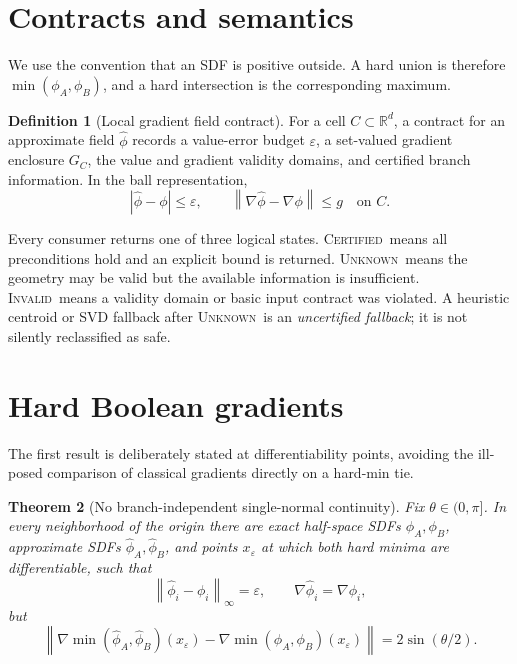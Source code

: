 \documentclass[11pt]{article}
\newtheorem{theorem}{Theorem}
\theoremstyle{definition}
\newtheorem{definition}[theorem]{Definition}
\newcommand{\R}{\mathbb{R}}
\newcommand{\norm}[1]{\left\lVert#1\right\rVert}
\newcommand{\Certified}{\textsc{Certified}}
\newcommand{\Unknown}{\textsc{Unknown}}
\newcommand{\Invalid}{\textsc{Invalid}}
\begin{document}
\section{Contracts and semantics}

We use the convention that an SDF is positive outside.  A hard union is
therefore \(\min(\phi_A,\phi_B)\), and a hard intersection is the corresponding
maximum.

\begin{definition}[Local gradient field contract]
For a cell \(C\subset\R^d\), a contract for an approximate field
\(\widehat\phi\) records a value-error budget \(\varepsilon\), a set-valued
gradient enclosure \(G_C\), the value and gradient validity domains, and
certified branch information.  In the ball representation,
\[
|\widehat\phi-\phi|\le\varepsilon,
\qquad
\norm{\nabla\widehat\phi-\nabla\phi}\le g
\quad\text{on }C.
\]
\end{definition}

Every consumer returns one of three logical states.  \Certified\ means all
preconditions hold and an explicit bound is returned.  \Unknown\ means the
geometry may be valid but the available information is insufficient.
\Invalid\ means a validity domain or basic input contract was violated.  A
heuristic centroid or SVD fallback after \Unknown\ is an \emph{uncertified
fallback}; it is not silently reclassified as safe.

\section{Hard Boolean gradients}

The first result is deliberately stated at differentiability points, avoiding
the ill-posed comparison of classical gradients directly on a hard-min tie.

\begin{theorem}[No branch-independent single-normal continuity]
\label{thm:hard-negative}
Fix \(\theta\in(0,\pi]\).  In every neighborhood of the origin there are exact
half-space SDFs \(\phi_A,\phi_B\), approximate SDFs
\(\widehat\phi_A,\widehat\phi_B\), and points \(x_\varepsilon\) at which both
hard minima are differentiable, such that
\[
\norm{\widehat\phi_i-\phi_i}_\infty=\varepsilon,
\qquad
\nabla\widehat\phi_i=\nabla\phi_i,
\]
but
\[
\norm{\nabla\min(\widehat\phi_A,\widehat\phi_B)(x_\varepsilon)
-\nabla\min(\phi_A,\phi_B)(x_\varepsilon)}
=2\sin(\theta/2).
\]
\end{theorem}
\end{document}
